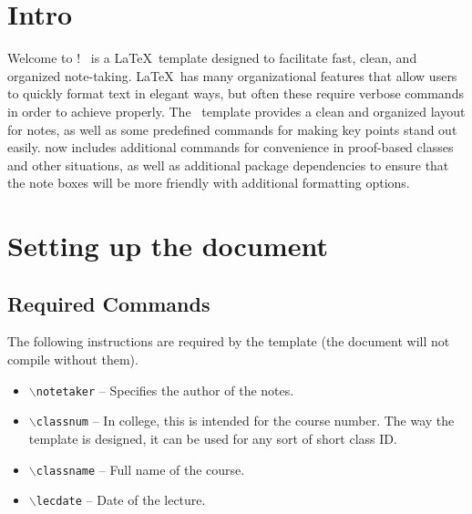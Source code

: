 \documentclass{ClassTeX2}
\begin{document}
	\maketitle
	\section{Intro}
	Welcome to \ClassTeX!  \ClassTeX\ is a \LaTeX\ template designed to facilitate fast, clean, and organized note-taking.  \LaTeX\ has many organizational features that allow users to quickly format text in elegant ways, but often these require verbose commands in order to achieve properly.  The \ClassTeX\ template provides a clean and organized layout for notes, as well as some predefined commands for making key points stand out easily.  \ClassTeX now includes additional commands for convenience in proof-based classes and other situations, as well as additional package dependencies to ensure that the note boxes will be more friendly with additional formatting options.
	
	\section{Setting up the document}
	
	\subsection{Required Commands}
	The following instructions are required by the template (the document will not compile without them).
	\begin{itemize}
		\item \texttt{$\backslash$notetaker} -- Specifies the author of the notes.
		\item \texttt{$\backslash$classnum} -- In college, this is intended for the course number.  The way the template is designed, it can be used for any sort of short class ID.
		\item \texttt{$\backslash$classname} -- Full name of the course.
		\item \texttt{$\backslash$lecdate} -- Date of the lecture.
	\end{itemize}
	
\end{document}
